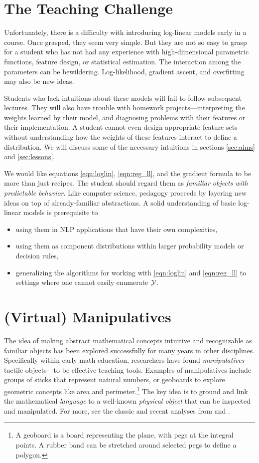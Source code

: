 \documentclass[11pt,letterpaper]{article}
\begin{document}
\section{The Teaching Challenge} \label{sec:challenges}

Unfortunately, there is a difficulty with introducing log-linear
models early in a course.  Once grasped, they seem very simple.  But
they are not so easy to grasp for a student who has not had any
experience with high-dimensional parametric functions, feature
design, or statistical estimation.  The interaction among the parameters can be
bewildering.  Log-likelihood, gradient ascent, and overfitting may also
be new ideas.

Students who lack intuitions about these models will fail to follow
subsequent lectures.  They will also have trouble with homework
projects---interpreting the weights learned by their model, and
diagnosing problems with their features or their implementation.  A
student cannot even design appropriate feature sets without
understanding how the weights of these features interact to define a
distribution.  We will discuss some of the necessary intuitions in
sections \ref{sec:aims} and \ref{sec:lessons}.

We would like equations \eqref{eqn:loglin}, \eqref{eqn:reg_ll}, and the
gradient formula to be more than just recipes.  The student should
regard them as {\em familiar objects with predictable behavior}.  Like
computer science, pedagogy proceeds by layering new ideas on top of
already-familiar abstractions.  A solid understanding of basic
log-linear models is prerequisite to 
\begin{itemize}
\item using them in NLP applications that have their own complexities, 
\item using them as component distributions within larger probability
  models or decision rules,
\item generalizing the algorithms for working with \eqref{eqn:loglin}
  and \eqref{eqn:reg_ll} to settings where one cannot easily enumerate
  ${\cal Y}$.
\end{itemize}
  
\section{(Virtual) Manipulatives}
The idea of making abstract mathematical concepts intuitive and recognizable as familiar objects 
has been explored successfully for many years in other disciplines. Specifically within early 
math education, researchers have found \textit{manipulatives}---tactile
objects---to be effective teaching tools. Examples of manipulatives include groups of 
sticks that represent natural numbers, or geoboards
to explore geometric concepts like area and perimeter.\footnote{A
  geoboard is a board representing the plane, with pegs at the integral points.  A rubber
  band can be stretched around selected pegs to define a polygon.} The key idea is to 
ground and link the mathematical \textit{language} to a well-known \textit{physical 
object} that can be inspected and manipulated.  For more, see the classic and recent analyses from
 and .
\end{document}
